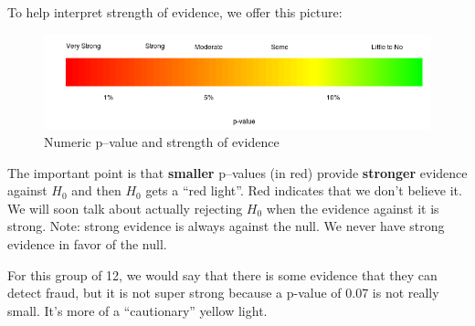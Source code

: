  To help interpret strength of evidence, we offer this picture:
 \begin{figure}[h]
   \centering
\includegraphics[width=\linewidth]{../plots/pvalueStrengths.png}
   \caption{Numeric p--value and strength of evidence}
   \label{fig:SOE-pvalue}
 \end{figure}

  The important point is that {\bf smaller} p--values (in red) provide {\bf
    stronger} evidence against $H_0$ and then $H_0$ gets a ``red
  light''. Red indicates that we don't believe it.  We will soon talk
  about actually rejecting $H_0$ when the evidence against it is
  strong.  Note:  strong evidence is always against the null. We never
  have strong evidence in favor of the null.  

  For this group of 12, we would say that there is some evidence that
  they can detect fraud, but it is not super strong because a p-value
  of 0.07 is not really small. It's more of a ``cautionary'' yellow
  light. 

